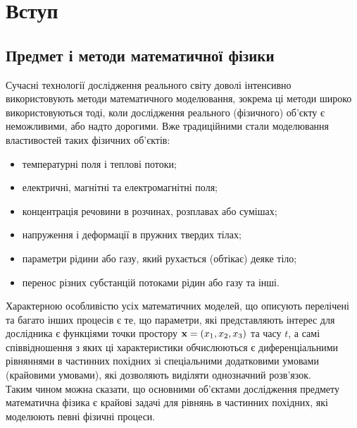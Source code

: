 \section{Вступ}

\subsection{Предмет і методи математичної фізики}

Сучасні технології дослідження реального світу доволі інтенсивно використовують методи математичного моделювання, зокрема ці методи широко використовуються тоді, коли дослідження реального (фізичного) об’єкту є неможливими, або надто дорогими. Вже традиційними стали моделювання властивостей таких фізичних об’єктів:
\begin{itemize}
	\item температурні поля і теплові потоки;
	\item електричні, магнітні та електромагнітні поля;
	\item концентрація речовини в розчинах, розплавах або сумішах;
	\item напруження і деформації в пружних твердих тілах;
	\item параметри рідини або газу, який рухається (обтікає) деяке тіло;
	\item перенос різних субстанцій потоками рідин або газу та інші.
\end{itemize}

Характерною особливістю усіх математичних моделей, що описують перелічені та багато інших процесів є те, що параметри, які представляють інтерес для дослідника є функціями точки простору $\bf{x} = (x_1, x_2, x_3)$ та часу $t$, а самі співвідношення з яких ці характеристики обчислюються є диференціальними рівняннями в частинних похідних зі спеціальними додатковими умовами (крайовими умовами), які дозволяють виділяти однозначний розв’язок. \\

Таким чином можна сказати, що основними об’єктами дослідження предмету математична фізика є крайові задачі для рівнянь в частинних похідних, які моделюють певні фізичні процеси. \\

